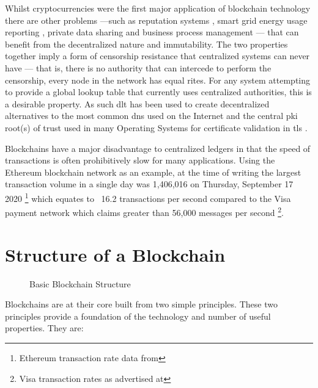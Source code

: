 Whilst cryptocurrencies were the first major application of blockchain technology there are other problems ---such as reputation systems \cite{khaqqiIncorporatingSellerBuyer2018,patelKiRTiBlockchainbasedCredit2020}, smart grid energy usage reporting \cite{gaoGridMonitoringSecuredSovereign2018}, private data sharing \cite{wangSPDSSecureAuditable2020} and business process management \cite{BlockchainsBusinessProcess}--- that can benefit from the decentralized nature and immutability. The two properties together imply a form of censorship resistance that centralized systems can never have --- that is, there is no authority that can intercede to perform the censorship, every node in the network has equal rites. For any system attempting to provide a global lookup table that currently uses centralized authorities, this is a desirable property. As such \gls{dlt} has been used to create decentralized alternatives to the most common \gls{dns} used on the Internet \cite{Namecoin,ENSEthereumName,UnstoppableDomainsDocumentation} and the central \gls{pki} root(s) of trust used in many Operating Systems for certificate validation in \gls{tls} \cite{yakubovBlockchainbasedPKIManagement2018,kubilayCertLedgerNewPKI2019,matsumotoIKPTurningPKI2016}.

Blockchains have a major disadvantage to centralized ledgers in that the speed of transactions is often prohibitively slow for many applications. Using the Ethereum blockchain network as an example, at the time of writing the largest transaction volume in a single day was 1,406,016 on Thursday, September 17 2020 \footnote{Ethereum transaction rate data from } which equates to ~16.2 transactions per second compared to the Visa payment network which claims greater than 56,000 messages per second \footnote{Visa transaction rates as advertised at }.


\section{Structure of a Blockchain}
\label{ch:blockchain:structure}

\begin{figure}[h]
    \centering
    
    \caption{Basic Blockchain Structure}
    \label{fig:basic-blockchain}
\end{figure}


Blockchains are at their core built from two simple principles. These two principles provide a foundation of the technology and number of useful properties. They are:

